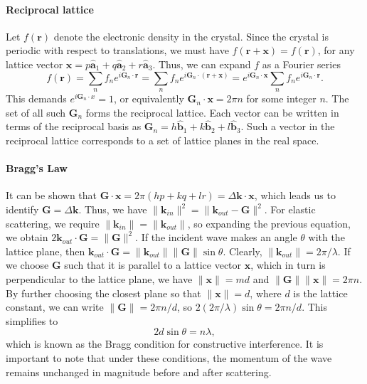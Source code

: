 \documentclass[11pt]{article}
\newcommand\norm[1]{\| #1 \|}
\newcommand\bvec[1]{\boldsymbol{#1}}
\newcommand\kk{\bvec{k}}
\newcommand\x{\bvec{x}}
\newcommand\G{\bvec{G}}
\newcommand\ahat{\bvec{\hat{a}}}
\newcommand\bhat{\bvec{\hat{b}}}
\begin{document}
        \paragraph{Reciprocal lattice}
        Let $f(\bvec{r})$ denote the electronic density in the crystal. Since the crystal is periodic with respect to translations,
        we must have $f(\bvec{r} + \x) = f(\bvec{r})$, for any lattice vector $\x = p\ahat_1 + q\ahat_2 + r\ahat_3$.
        Thus, we can expand $f$ as a Fourier series
        \[
                f(\bvec{r}) = \sum_{n} f_n e^{i\G_n\cdot\bvec{r}} = \sum_{n} f_n e^{i\G_n\cdot(\bvec{r} + \x)} = 
                e^{i\G_n\cdot\x}\sum_{n} f_n e^{i\G_n\cdot\bvec{r}}.
        \]
        This demands $e^{i\G_n\cdot x} = 1$, or equivalently $\G_n\cdot\x = 2\pi n$ for some integer $n$.
        The set of all such $\G_n$ forms the reciprocal lattice. Each vector can be written in terms of the reciprocal basis as 
        $\G_n = h\bhat_1 + k\bhat_2 + l\bhat_3$.
        Such a vector in the reciprocal lattice corresponds to a set of lattice planes in the real space.

        \paragraph{Bragg's Law}
        It can be shown that $\G\cdot\x = 2\pi(hp + kq + lr) = \Delta\kk\cdot\x$, which leads us to identify $\G = \Delta\kk$.
        Thus, we have $\norm{\kk_{in}}^2 = \norm{\kk_{out} - \G}^2$. For elastic scattering, we require $\norm{\kk_{in}} = \norm{\kk_{out}}$,
        so expanding the previous equation, we obtain $2\kk_{out}\cdot\G = \norm{\G}^2$. If the incident wave makes an angle $\theta$ with the lattice
        plane, then $\kk_{out}\cdot\G = \norm{\kk_{out}}\norm{\G}\sin\theta$. Clearly, $\norm{\kk_{out}} = 2\pi /\lambda$.
        If we choose $\G$ such that it is parallel to a lattice vector $\x$, which in turn is perpendicular to the lattice plane,
        we have $\norm{\x} = md$ and $\norm{\G}\norm{\x} = 2\pi n$. By further choosing the closest plane so that $\norm{\x} = d$,
        where $d$ is the lattice constant, we can write $\norm{\G} = 2\pi n/ d$, so $2(2\pi /\lambda)\sin\theta = 2\pi n/ d$.
        This simplifies to 
        \[
                2d\sin\theta = n\lambda,
        \]
        which is known as the Bragg condition for constructive interference.
        It is important to note that under these conditions, the momentum of the wave remains unchanged in magnitude before and after scattering.
\end{document}
